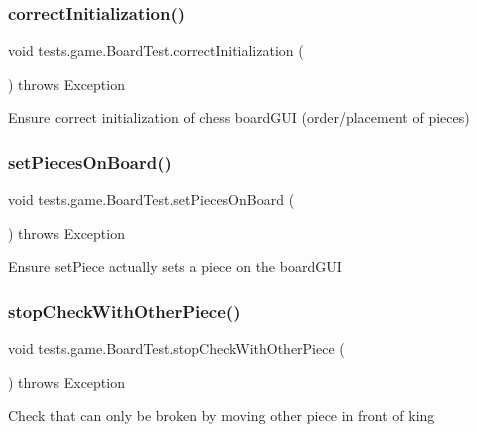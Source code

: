 \subsubsection{\texorpdfstring{correct\+Initialization()}{correctInitialization()}}
{\footnotesize\ttfamily void tests.\+game.\+Board\+Test.\+correct\+Initialization (\begin{DoxyParamCaption}{ }\end{DoxyParamCaption}) throws Exception}

Ensure correct initialization of chess board\+G\+UI (order/placement of pieces) \hypertarget{classtests_1_1game_1_1_board_test_afa846288b3dabd6963930c3c230a9fd5}{}\label{classtests_1_1game_1_1_board_test_afa846288b3dabd6963930c3c230a9fd5} 
\subsubsection{\texorpdfstring{set\+Pieces\+On\+Board()}{setPiecesOnBoard()}}
{\footnotesize\ttfamily void tests.\+game.\+Board\+Test.\+set\+Pieces\+On\+Board (\begin{DoxyParamCaption}{ }\end{DoxyParamCaption}) throws Exception}

Ensure set\+Piece actually sets a piece on the board\+G\+UI \hypertarget{classtests_1_1game_1_1_board_test_aa129ae9e125061904fdf6ae16ddf8d40}{}\label{classtests_1_1game_1_1_board_test_aa129ae9e125061904fdf6ae16ddf8d40} 
\subsubsection{\texorpdfstring{stop\+Check\+With\+Other\+Piece()}{stopCheckWithOtherPiece()}}
{\footnotesize\ttfamily void tests.\+game.\+Board\+Test.\+stop\+Check\+With\+Other\+Piece (\begin{DoxyParamCaption}{ }\end{DoxyParamCaption}) throws Exception}

Check that can only be broken by moving other piece in front of king \hypertarget{classtests_1_1game_1_1_board_test_aafeeee28a08b09f5fee754f011ff05b1}{}\label{classtests_1_1game_1_1_board_test_aafeeee28a08b09f5fee754f011ff05b1} 
